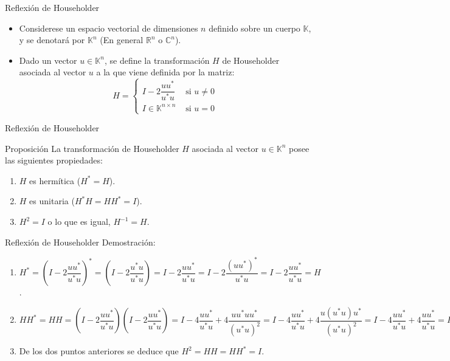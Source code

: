 \documentclass{beamer}
\begin{document}
\begin{frame}{Reflexi\'on de Householder}
  \begin{itemize}
    \item Considerese un espacio vectorial de dimensiones $n$ definido sobre un cuerpo $\mathbb{K}$, y se denotar\'a por $\mathbb{K}^n$ (En general $\mathbb{R}^n$ o $\mathbb{C}^n$).
    \item<2-> Dado un vector $u \in \mathbb{K}^n$, se define la transformaci\'on $H$ de Householder asociada al vector $u$ a la que viene definida por la matriz:
  $$
  H = \begin{cases}
    I - 2\dfrac{uu^*}{u^*u} & \mbox{ si } u \neq 0\\
    I \in \mathbb{K}^{n\times n} & \mbox{ si } u = 0
  \end{cases}
  $$
\end{itemize}
\end{frame}
\begin{frame}{Reflexi\'on de Householder}
  \begin{block}{Proposici\'on}
    La transformaci\'on de Householder $H$ asociada al vector $u \in \mathbb{K}^n$ posee las siguientes propiedades:
    \begin{enumerate}
      \item<2-> $H$ es herm\'itica ($H^*=H$).
      \item<3-> $H$ es unitaria ($H^*H = HH^* = I$).
      \item<4-> $H^2 = I$ o lo que es igual, $H^{-1}=H$.
    \end{enumerate}
  \end{block}
\end{frame}
\begin{frame}{Reflexi\'on de Householder}
  Demostraci\'on:
  \begin{enumerate}
    \item<2-> $H^* = \left(I-2\dfrac{uu^*}{u^*u}\right)^* = \left(I-2\dfrac{u^*u}{u^*u}\right) = I-2\dfrac{uu^*}{u^*u} = I-2\dfrac{(uu^*)^*}{u^*u} = I-2\dfrac{uu^*}{u^*u} = H$.
    \item<3-> $HH^* = HH = \left(I-2\dfrac{uu^*}{u^*u}\right)\left(I-2\dfrac{uu^*}{u^*u}\right) = I-4\dfrac{uu^*}{u^*u} + 4\dfrac{uu^*uu^*}{(u^*u)^2} = I-4\dfrac{uu^*}{u^*u} + 4\dfrac{u(u^*u)u^*}{(u^*u)^2} = I-4\dfrac{uu^*}{u^*u} + 4\dfrac{uu^*}{u^*u} = I$
    \item<4-> De los dos puntos anteriores se deduce que $ H^2= HH = HH^* = I$.
  \end{enumerate}
\end{frame}
\end{document}
